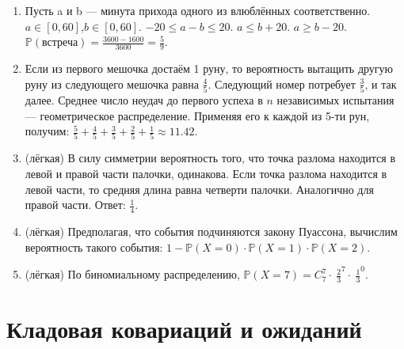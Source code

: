 \documentclass[a4paper,12pt]{article}
\def \P{\mathbb{P}}
\begin{document}
\begin{enumerate}
\item
Пусть a и b — минута прихода одного из влюблённых соответственно. $a\in[0,60]$,$b\in[0,60]$.
$-20\le a-b \le20$.
\newline $a \le b+20$. $a \ge b-20$. \newline $\P(\text{встреча})=\frac{3600-1600}{3600}=\frac{5}{9}$.
\item
Если из первого мешочка достаём 1 руну, то вероятность вытащить другую руну из следующего мешочка равна $\frac{4}{5}$. 
Следующий номер потребует $\frac{3}{5}$, и так далее. 
Среднее число неудач до первого успеха в $n$ независимых испытания — геометрическое распределение. 
Применяя его к каждой из 5-ти рун, получим:
    $\frac{5}{5}+\frac{4}{5}+\frac{3}{5}+\frac{2}{5}+\frac{1}{5}\approx 11.42$.
\item (лёгкая)
В силу симметрии вероятность того, что точка разлома находится в левой и правой части палочки, одинакова.
Если точка разлома находится в левой части, то средняя длина равна четверти палочки.
Аналогично для правой части. Ответ: $\frac{1}{4}$.
\item (лёгкая)
Предполагая, что события подчиняются закону Пуассона, вычислим вероятность
такого события: $1-\P(X=0)\cdot \P(X=1)\cdot \P(X=2)$.
\item (лёгкая)
По биномиальному распределению,
$\P(X=7)=C^7_7\cdot\ {\frac{2}{3}}^7\cdot \ {\frac{1}{3}}^0$.
\end{enumerate}

\newpage
\section{Кладовая ковариаций и ожиданий}
\end{document}
